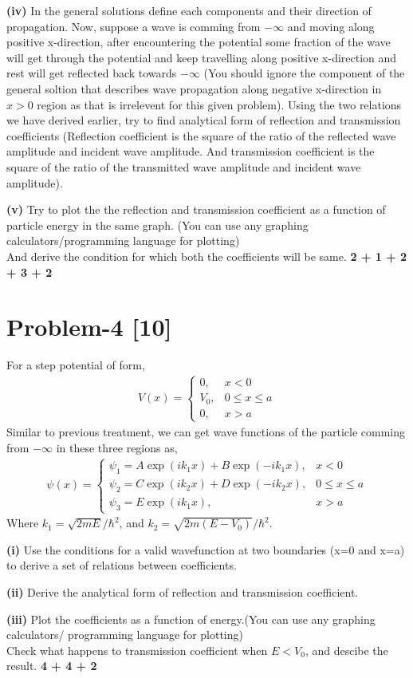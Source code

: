 \documentclass[12pt, a4paper]{article}
\begin{document}
\textbf{(iv)} In the general solutions define each components and their direction of propagation. Now,
suppose a wave is comming from $-\infty$ and moving along positive x-direction, after encountering the 
potential some fraction of the wave will get through the potential and keep travelling along positive 
x-direction and rest will get reflected back towards $-\infty$ (You should ignore the component of the 
general soltion that describes wave propagation along negative x-direction in $x>0$ region as that is 
irrelevent for this given problem). Using the two relations we have derived earlier, try to find 
analytical form of reflection and transmission coefficients (Reflection coefficient is the square of 
the ratio of the reflected wave amplitude and incident wave amplitude. And transmission coefficient is 
the square of the ratio of the transmitted wave amplitude and incident wave amplitude).

\textbf{(v)} Try to plot the the reflection and transmission coefficient as a function of particle 
energy in the same graph. (You can use any graphing calculators/programming language for plotting) \\
And derive the condition for which both the coefficients will be same.
\hfill\textbf{2 + 1 + 2 + 3 + 2}

\section*{Problem-4 \hfill \textbf{[10]}}
For a step potential of form,
\begin{align*}
    V(x) = \begin{cases}
        0, & x < 0 \\
        V_0, & 0 \leq x \leq a\\
        0, & x > a
\end{cases}
\end{align*}
Similar to previous treatment,  we can get wave functions of the particle comming from $-\infty$ 
in these three regions as,
\begin{align*}
    \psi(x) = \begin{cases}
        \psi_1 = A\exp(ik_1x) + B\exp(-ik_1x), & x < 0 \\
        \psi_2 = C\exp(ik_2x) + D\exp(-ik_2x), & 0 \leq x \leq a\\
        \psi_3 = E\exp(ik_1x), & x > a
\end{cases}
\end{align*}
Where $k_1 = \sqrt{2mE}/\hbar^2$, and $k_2 = \sqrt{2m(E-V_0)}/\hbar^2$.

\textbf{(i)} Use the conditions for a valid wavefunction at two boundaries (x=0 and x=a) to derive a set 
of relations between coefficients. 

\textbf{(ii)} Derive the analytical form of reflection and transmission coefficient.

\textbf{(iii)} Plot the coefficients as a function of energy.(You can use any graphing calculators/
programming language for plotting)\\
Check what happens to transmission coefficient when $E < V_0$, and descibe the result.
\hfill\textbf{4 + 4 + 2}
\end{document}
